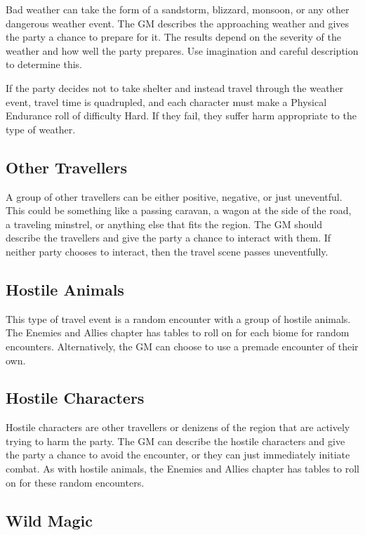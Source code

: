 \begin{multicols}{2}
Bad weather can take the form of a sandstorm, blizzard, monsoon, or any other
dangerous weather event. The GM describes the approaching weather and gives the
party a chance to prepare for it. The results depend on the severity of the
weather and how well the party prepares. Use imagination and careful description
to determine this.

If the party decides not to take shelter and instead travel through the weather
event, travel time is quadrupled, and each character must make a Physical Endurance
roll of difficulty Hard. If they fail, they suffer harm appropriate to the type
of weather.

\subsection{Other Travellers}

A group of other travellers can be either positive, negative, or just uneventful.
This could be something like a passing caravan, a wagon at the side of the road,
a traveling minstrel, or anything else that fits the region. The GM should describe
the travellers and give the party a chance to interact with them. If neither party
chooses to interact, then the travel scene passes uneventfully.

\subsection{Hostile Animals}

This type of travel event is a random encounter with a group of hostile animals. The
Enemies and Allies chapter has tables to roll on for each biome for random encounters.
Alternatively, the GM can choose to use a premade encounter of their own.

\subsection{Hostile Characters}

Hostile characters are other travellers or denizens of the region that are actively
trying to harm the party. The GM can describe the hostile characters and give the
party a chance to avoid the encounter, or they can just immediately initiate combat.
As with hostile animals, the Enemies and Allies chapter has tables to roll on for
these random encounters.

\subsection{Wild Magic}


\end{multicols}
